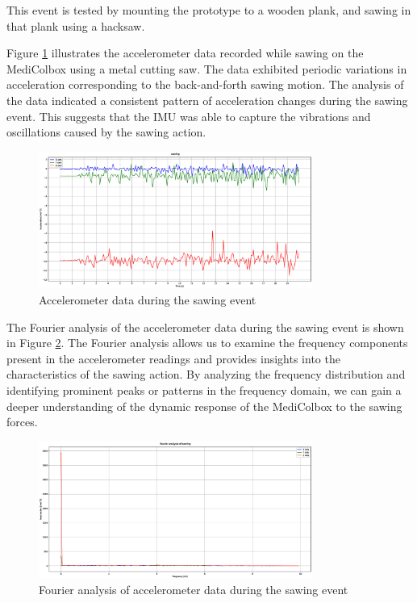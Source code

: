 \documentclass[../main.tex]{subfiles}
\begin{document}
This event is tested by mounting the prototype to a wooden plank, and sawing in that plank using a hacksaw.

Figure \ref{fig:accelerometer_sawing} illustrates the
accelerometer data recorded while sawing on the
MediColbox using a metal cutting saw.
The data exhibited periodic variations in acceleration
corresponding to the back-and-forth sawing motion.
The analysis of the data indicated a consistent pattern of
acceleration changes during the sawing event. This suggests that the IMU was able to capture the vibrations and oscillations caused by the sawing action.

\begin{figure}[htbp]
    \centering
    \includegraphics[width=0.8\textwidth]{resources/figures/Acceleration_sawing.eps}
    \caption{Accelerometer data during the sawing event}
    \label{fig:accelerometer_sawing}
\end{figure}

The Fourier analysis of the accelerometer data during the sawing event is shown in Figure \ref{fig:fourier_accelerometer_sawing}. The Fourier analysis allows us to examine the frequency components present in the accelerometer readings and provides insights into the characteristics of the sawing action. By analyzing the frequency distribution and identifying prominent peaks or patterns in the frequency domain, we can gain a deeper understanding of the dynamic response of the MediColbox to the sawing forces.

\begin{figure}[htbp]
    \centering
    \includegraphics[width=0.8\textwidth]{resources/figures/Fourier_acceleration_sawing.eps}
    \caption{Fourier analysis of accelerometer data during the sawing event}
    \label{fig:fourier_accelerometer_sawing}
\end{figure}
\end{document}
